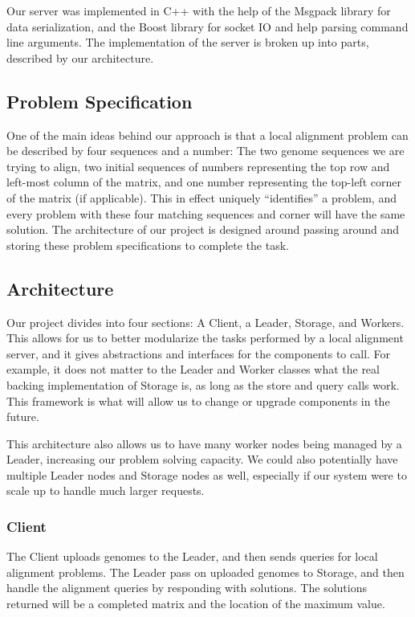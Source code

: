\documentclass[12pt]{article}
\begin{document}
Our server was implemented in C++ with the help of the Msgpack library for data serialization, and the Boost library for socket IO and help parsing command line arguments. The implementation of the server is broken up into parts, described by our architecture.

\subsection{Problem Specification}
One of the main ideas behind our approach is that a local alignment problem can be described by four sequences and a number: The two genome sequences we are trying to align, two initial sequences of numbers representing the top row and left-most column of the matrix, and one number representing the top-left corner of the matrix (if applicable). This in effect uniquely ``identifies'' a problem, and every problem with these four matching sequences and corner will have the same solution. The architecture of our project is designed around passing around and storing these problem specifications to complete the task.


\subsection{Architecture}
Our project divides into four sections: A Client, a Leader, Storage, and Workers. This allows for us to better modularize the tasks performed by a local alignment server, and it gives abstractions and interfaces for the components to call. For example, it does not matter to the Leader and Worker classes what the real backing implementation of Storage is, as long as the store and query calls work. This framework is what will allow us to change or upgrade components in the future. 

This architecture also allows us to have many worker nodes being managed by a Leader, increasing our problem solving capacity. 
We could also potentially have multiple Leader nodes and Storage nodes as well, especially if our system were to scale up to handle much larger requests.

\subsubsection{Client}
The Client uploads genomes to the Leader, and then sends queries for local alignment problems. The Leader pass on uploaded genomes to Storage, and then handle the alignment queries by responding with solutions. The solutions returned will be a completed matrix and the location of the maximum value.
\end{document}
